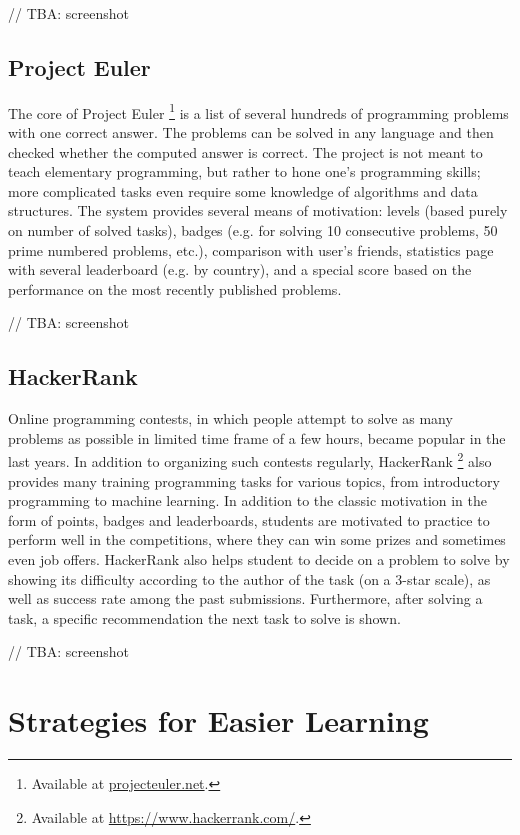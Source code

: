 \documentclass[
    digital,
    color,
    11pt,
    nocover,
    table,  %
    nolof,  %
    nolot,  %
    microtype,
]{fithesis3}
\begin{document}
// TBA: screenshot


\subsection{Project Euler}
\label{sec:project-euler}
The core of Project Euler%
\footnote{Available at \url{projecteuler.net}.}
is a list of several hundreds of programming problems with one correct answer.
The problems can be solved in any language
and then checked whether the computed answer is correct.
The project is not meant to teach elementary programming,
but rather to hone one’s programming skills;
more complicated tasks even require some knowledge of algorithms and data structures.
The system provides several means of motivation:
levels (based purely on number of solved tasks), badges
(e.g. for solving 10 consecutive problems, 50 prime numbered problems, etc.),
comparison with user’s friends,
statistics page with several leaderboard (e.g. by country),
and a special score based on the performance on the most recently published problems.

// TBA: screenshot


\subsection{HackerRank}
\label{sec:hacker-rank}

Online programming contests,
in which people attempt to solve as many problems as possible
in limited time frame of a few hours,
became popular in the last years.
In addition to organizing such contests regularly,
HackerRank%
\footnote{Available at \url{https://www.hackerrank.com/}.}
also provides many training programming tasks for various topics,
from introductory programming to machine learning.
In addition to the classic motivation in the form of points, badges and leaderboards, students are motivated to practice to perform well in the competitions,
where they can win some prizes and sometimes even job offers.
HackerRank also helps student to decide on a problem to solve by showing its difficulty according to the author of the task (on a 3-star scale),
as well as success rate among the past submissions.
Furthermore, after solving a task,
a specific recommendation the next task to solve is shown.

// TBA: screenshot


\section{Strategies for Easier Learning}
\label{sec:strategies-for-easier-learning}
\end{document}
